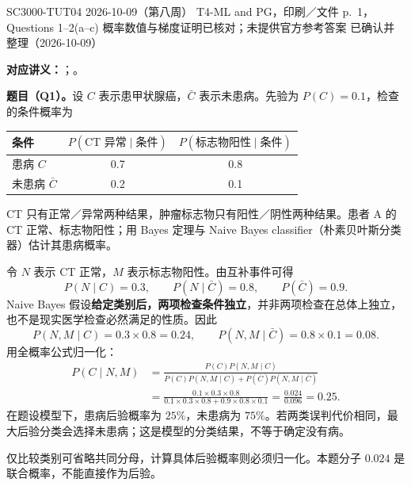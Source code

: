 
\label{tutorial:SC3000-TUT04}

\tutorialmeta
  {SC3000-TUT04}
  {2026-10-09（第八周）}
  {T4-ML and PG，印刷／文件 p.~1，Questions 1--2(a--c)}
  {概率数值与梯度证明已核对；未提供官方参考答案}
  {已确认并整理（2026-10-09）}


\textbf{对应讲义：}；。

\textbf{题目（Q1）。}设 $C$ 表示患甲状腺癌，$\bar C$ 表示未患病。先验为 $P(C)=0.1$，检查的条件概率为
\begin{center}
\begin{tabular}{@{}lcc@{}}
\toprule
条件 & $P(\text{CT 异常}\mid\text{条件})$ & $P(\text{标志物阳性}\mid\text{条件})$ \\
\midrule
患病 $C$ & 0.7 & 0.8 \\
未患病 $\bar C$ & 0.2 & 0.1 \\
\bottomrule
\end{tabular}
\end{center}
CT 只有正常／异常两种结果，肿瘤标志物只有阳性／阴性两种结果。患者 A 的 CT 正常、标志物阳性；用 Bayes 定理与 Naive Bayes classifier（朴素贝叶斯分类器）估计其患病概率。

\begin{checkedsolution}
令 $N$ 表示 CT 正常，$M$ 表示标志物阳性。由互补事件可得
\[
 P(N\mid C)=0.3,\qquad P(N\mid\bar C)=0.8,\qquad P(\bar C)=0.9.
\]
Naive Bayes 假设\textbf{给定类别后，两项检查条件独立}，并非两项检查在总体上独立，也不是现实医学检查必然满足的性质。因此
\[
 P(N,M\mid C)=0.3\times0.8=0.24,\qquad
 P(N,M\mid\bar C)=0.8\times0.1=0.08.
\]
用全概率公式归一化：
\[
\begin{aligned}
 P(C\mid N,M)
 &=\frac{P(C)P(N,M\mid C)}
 {P(C)P(N,M\mid C)+P(\bar C)P(N,M\mid\bar C)}\\
 &=\frac{0.1\times0.3\times0.8}
 {0.1\times0.3\times0.8+0.9\times0.8\times0.1}
 =\frac{0.024}{0.096}=\boxed{0.25}.
\end{aligned}
\]
在题设模型下，患病后验概率为 $25\%$，未患病为 $75\%$。若两类误判代价相同，最大后验分类会选择未患病；这是模型的分类结果，不等于确定没有病。

仅比较类别可省略共同分母，计算具体后验概率则必须归一化。本题分子 $0.024$ 是联合概率，不能直接作为后验。
\end{checkedsolution}

